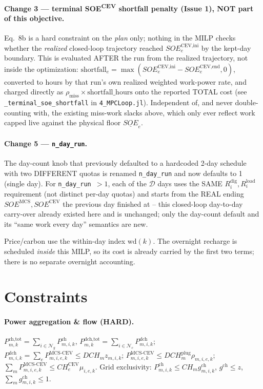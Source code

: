 \documentclass[11pt]{article}
\begin{document}
\paragraph{Change 3 --- terminal SOE\textsuperscript{CEV} shortfall penalty (Issue 1), NOT part of
this objective.} Eq.~8b is a hard constraint on the \emph{plan} only; nothing in the MILP checks
whether the \emph{realized} closed-loop trajectory reached $SOE^{\text{CEV,ini}}_e$ by the kept-day
boundary. This is evaluated AFTER the run from the realized trajectory, not inside the
optimization: $\text{shortfall}_e=\max(SOE^{\text{CEV,ini}}_e-SOE^{\text{CEV,end}}_e,0)$, converted
to hours by that run's own realized weighted work-power rate, and charged directly as
$\rho_{\text{miss}}\times\text{shortfall\_hours}$ onto the reported TOTAL cost (see
\texttt{\_terminal\_soe\_shortfall} in \texttt{4\_MPCLoop.jl}). Independent of, and never
double-counting with, the existing miss-work slacks above, which only ever reflect work capped
live against the physical floor $\underline{SOE}_e$.

\paragraph{Change 5 --- \texttt{n\_day\_run}.} The day-count knob that previously defaulted to a
hardcoded 2-day schedule with two DIFFERENT quotas is renamed \texttt{n\_day\_run} and now defaults
to 1 (single day). For \texttt{n\_day\_run}~$>1$, each of the $\mathcal{D}$ days uses the SAME
$R^{\text{dig}}_i,R^{\text{load}}_i$ requirement (not distinct per-day quotas) and starts from the
REAL ending $SOE^{\text{MCS}},SOE^{\text{CEV}}$ the previous day finished at -- this closed-loop
day-to-day carry-over already existed here and is unchanged; only the day-count default and its
``same work every day'' semantics are new.

Price/carbon use the within-day index $\mathrm{wd}(k)$. The overnight recharge is scheduled
\emph{inside} this MILP, so its cost is already carried by the first two terms; there is no
separate overnight accounting.

\section{Constraints}

\paragraph{Power aggregation \& flow (HARD).}
$P^{\text{ch,tot}}_{m,k}=\sum_{i\in\mathcal{N}_g}P^{\text{ch}}_{m,i,k}$,
$P^{\text{dch,tot}}_{m,k}=\sum_{i\in\mathcal{N}_c}P^{\text{dch}}_{m,i,k}$;
$P^{\text{dch}}_{m,i,k}=\sum_e P^{\text{MCS-CEV}}_{m,i,e,k}\le DCH_m z_{m,i,k}$;
$P^{\text{MCS-CEV}}_{m,i,e,k}\le DCH^{\text{plug}}_m\rho_{m,i,e,k}$;
$\sum_m P^{\text{MCS-CEV}}_{m,i,e,k}\le CH^{\text{CEV}}_e\mu_{i,e,k}$.
Grid exclusivity: $P^{\text{ch}}_{m,i,k}\le CH_m g^{\text{ch}}_{m,i,k}$,
$g^{\text{ch}}\le z$, $\sum_m g^{\text{ch}}_{m,i,k}\le 1$.
\end{document}

